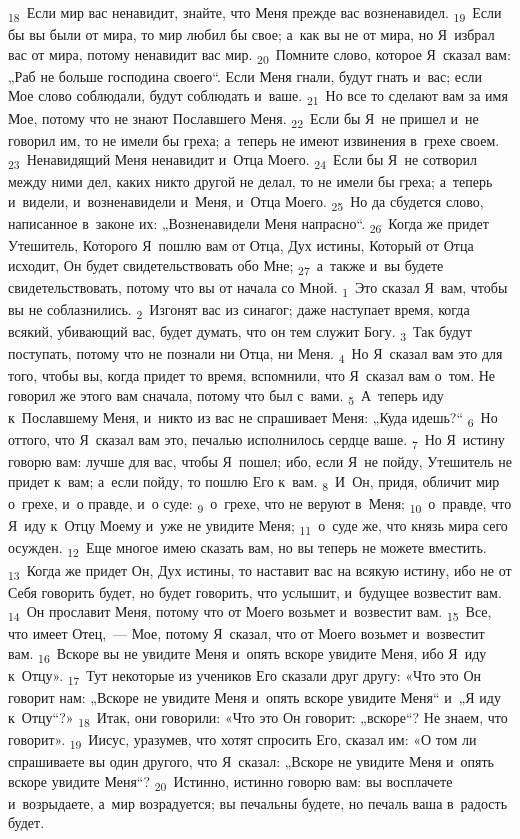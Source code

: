 \documentclass[a4paper,12pt]{article}
\begin{document}
\textsubscript{18}~Если мир вас ненавидит, знайте, что Меня прежде вас возненавидел. \textsubscript{19}~Если бы вы были от мира, то мир любил бы свое; а~как вы не от мира, но Я~избрал вас от мира, потому ненавидит вас мир. \textsubscript{20}~Помните слово, которое Я~сказал вам: „Раб не больше господина своего“. Если Меня гнали, будут гнать и~вас; если Мое слово соблюдали, будут соблюдать и~ваше. \textsubscript{21}~Но все то сделают вам за имя Мое, потому что не знают Пославшего Меня. \textsubscript{22}~Если бы Я~не пришел и~не говорил им, то не имели бы греха; а~теперь не имеют извинения в~грехе своем. \textsubscript{23}~Ненавидящий Меня ненавидит и~Отца Моего. \textsubscript{24}~Если бы Я~не сотворил между ними дел, каких никто другой не делал, то не имели бы греха; а~теперь и~видели, и~возненавидели и~Меня, и~Отца Моего. \textsubscript{25}~Но да сбудется слово, написанное в~законе их: „Возненавидели Меня напрасно“. \textsubscript{26}~Когда же придет Утешитель, Которого Я~пошлю вам от Отца, Дух истины, Который от Отца исходит, Он будет свидетельствовать обо Мне; \textsubscript{27}~а~также и~вы будете свидетельствовать, потому что вы от начала со Мной. \textsubscript{1}~Это сказал Я~вам, чтобы вы не соблазнились. \textsubscript{2}~Изгонят вас из синагог; даже наступает время, когда всякий, убивающий вас, будет думать, что он тем служит Богу. \textsubscript{3}~Так будут поступать, потому что не познали ни Отца, ни Меня. \textsubscript{4}~Но Я~сказал вам это для того, чтобы вы, когда придет то время, вспомнили, что Я~сказал вам о~том. Не говорил же этого вам сначала, потому что был с~вами. \textsubscript{5}~А~теперь иду к~Пославшему Меня, и~никто из вас не спрашивает Меня: „Куда идешь?“ \textsubscript{6}~Но оттого, что Я~сказал вам это, печалью исполнилось сердце ваше. \textsubscript{7}~Но Я~истину говорю вам: лучше для вас, чтобы Я~пошел; ибо, если Я~не пойду, Утешитель не придет к~вам; а~если пойду, то пошлю Его к~вам. \textsubscript{8}~И~Он, придя, обличит мир о~грехе, и~о правде, и~о суде: \textsubscript{9}~о~грехе, что не веруют в~Меня; \textsubscript{10}~о~правде, что Я~иду к~Отцу Моему и~уже не увидите Меня; \textsubscript{11}~о~суде же, что князь мира сего осужден. \textsubscript{12}~Еще многое имею сказать вам, но вы теперь не можете вместить. \textsubscript{13}~Когда же придет Он, Дух истины, то наставит вас на всякую истину, ибо не от Себя говорить будет, но будет говорить, что услышит, и~будущее возвестит вам. \textsubscript{14}~Он прославит Меня, потому что от Моего возьмет и~возвестит вам. \textsubscript{15}~Все, что имеет Отец,~--- Мое, потому Я~сказал, что от Моего возьмет и~возвестит вам. \textsubscript{16}~Вскоре вы не увидите Меня и~опять вскоре увидите Меня, ибо Я~иду к~Отцу». \textsubscript{17}~Тут некоторые из учеников Его сказали друг другу: «Что это Он говорит нам: „Вскоре не увидите Меня и~опять вскоре увидите Меня“ и~„Я иду к~Отцу“?» \textsubscript{18}~Итак, они говорили: «Что это Он говорит: „вскоре“? Не знаем, что говорит». \textsubscript{19}~Иисус, уразумев, что хотят спросить Его, сказал им: «О том ли спрашиваете вы один другого, что Я~сказал: „Вскоре не увидите Меня и~опять вскоре увидите Меня“? \textsubscript{20}~Истинно, истинно говорю вам: вы восплачете и~возрыдаете, а~мир возрадуется; вы печальны будете, но печаль ваша в~радость будет. 
\end{document}
